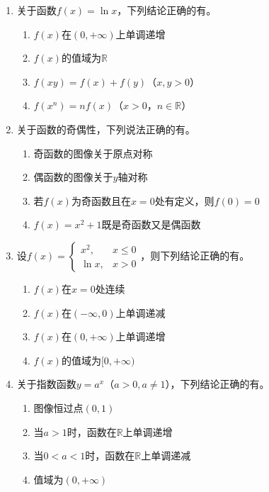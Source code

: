 \documentclass[12pt, a4paper]{ctexart}
\newcommand{\blank}[1]{\underline{\hspace{#1}}}
\begin{document}
\begin{enumerate}[start=9]
\item 关于函数$f(x)=\ln x$，下列结论正确的有\blank{3cm}。
\begin{enumerate}[label=\Alph*.]
\item $f(x)$在$(0,+\infty)$上单调递增
\item $f(x)$的值域为$\mathbb{R}$
\item $f(xy)=f(x)+f(y)$（$x,y>0$）
\item $f(x^n)=nf(x)$（$x>0$，$n\in\mathbb{R}$）
\end{enumerate}

\item 关于函数的奇偶性，下列说法正确的有\blank{3cm}。
\begin{enumerate}[label=\Alph*.]
\item 奇函数的图像关于原点对称
\item 偶函数的图像关于$y$轴对称
\item 若$f(x)$为奇函数且在$x=0$处有定义，则$f(0)=0$
\item $f(x)=x^2+1$既是奇函数又是偶函数
\end{enumerate}

\item 设$f(x)=\begin{cases} x^2, & x\leq 0 \\ \ln x, & x>0 \end{cases}$，则下列结论正确的有\blank{3cm}。
\begin{enumerate}[label=\Alph*.]
\item $f(x)$在$x=0$处连续
\item $f(x)$在$(-\infty,0)$上单调递减
\item $f(x)$在$(0,+\infty)$上单调递增
\item $f(x)$的值域为$[0,+\infty)$
\end{enumerate}

\item 关于指数函数$y=a^x$（$a>0,a\neq 1$），下列结论正确的有\blank{3cm}。
\begin{enumerate}[label=\Alph*.]
\item 图像恒过点$(0,1)$
\item 当$a>1$时，函数在$\mathbb{R}$上单调递增
\item 当$0<a<1$时，函数在$\mathbb{R}$上单调递减
\item 值域为$(0,+\infty)$
\end{enumerate}
\end{enumerate}
\end{document}
